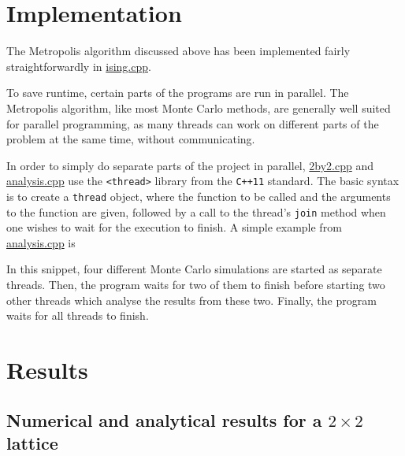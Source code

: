 \documentclass[12pt,english,a4paper]{article}
\newcommand{\program}[1]{\href{https://github.com/anjohan/Offentlig/blob/master/FYS3150/Oblig4/#1}{#1}}
\begin{document}
\section{Implementation}
The Metropolis algorithm discussed above has been implemented fairly straightforwardly in \program{ising.cpp}.

To save runtime, certain parts of the programs are run in parallel. The Metropolis algorithm, like most Monte Carlo methods, are generally well suited for parallel programming, as many threads can work on different parts of the problem at the same time, without communicating.

In order to simply do separate parts of the project in parallel, \program{2by2.cpp} and \program{analysis.cpp} use the \texttt{<thread>} library from the \texttt{C++11} standard. The basic syntax is to create a \texttt{thread} object, where the function to be called and the arguments to the function are given, followed by a call to the thread's \texttt{join} method when one wishes to wait for the execution to finish. A simple example from \program{analysis.cpp} is

In this snippet, four different Monte Carlo simulations are started as separate threads. Then, the program waits for two of them to finish before starting two other threads which analyse the results from these two. Finally, the program waits for all threads to finish.

\section{Results}


\subsection{Numerical and analytical results for a \(2\times2\) lattice}

\end{document}
